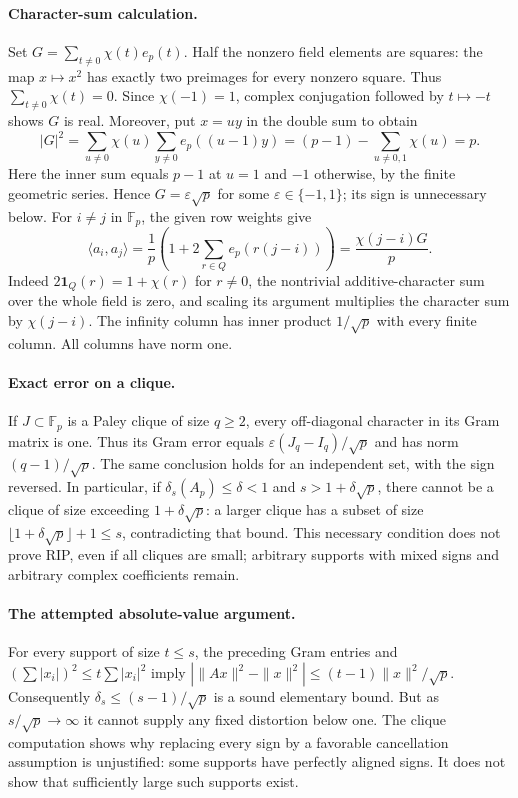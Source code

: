 \documentclass[11pt]{article}
\begin{document}
\paragraph{Character-sum calculation.}
Set $G=\sum_{t\ne0}\chi(t)e_p(t)$. Half the nonzero field elements are
squares: the map $x\mapsto x^2$ has exactly two preimages for every nonzero
square. Thus $\sum_{t\ne0}\chi(t)=0$. Since $\chi(-1)=1$,
complex conjugation followed by $t\mapsto-t$ shows $G$ is real.
Moreover, put $x=uy$ in the double sum to obtain
\[
|G|^2=\sum_{u\ne0}\chi(u)\sum_{y\ne0}e_p((u-1)y)
=(p-1)-\sum_{u\ne0,1}\chi(u)=p.
\]
Here the inner sum equals $p-1$ at $u=1$ and $-1$ otherwise, by the finite
geometric series. Hence $G=\varepsilon\sqrt p$ for some
$\varepsilon\in\{-1,1\}$; its sign is unnecessary below.
For $i\ne j$ in $\mathbb F_p$, the given row weights give
\[
\langle a_i,a_j\rangle
=\frac1p\left(1+2\sum_{r\in Q}e_p(r(j-i))\right)
=\frac{\chi(j-i)G}{p}.
\]
Indeed $2\boldsymbol1_Q(r)=1+\chi(r)$ for $r\ne0$, the nontrivial
additive-character sum over the whole field is zero, and scaling its argument
multiplies the character sum by $\chi(j-i)$. The infinity column has inner
product $1/\sqrt p$ with every finite column. All columns have norm one.

\paragraph{Exact error on a clique.}
If $J\subset\mathbb F_p$ is a Paley clique of size $q\ge2$, every off-diagonal
character in its Gram matrix is one. Thus its Gram error equals
$\varepsilon(J_q-I_q)/\sqrt p$ and has norm $(q-1)/\sqrt p$.
The same conclusion holds for an independent set, with the sign reversed.
In particular, if $\delta_s(A_p)\le\delta<1$ and
$s>1+\delta\sqrt p$, there cannot be a clique of size exceeding
$1+\delta\sqrt p$: a larger clique has a subset of size
$\lfloor1+\delta\sqrt p\rfloor+1\le s$, contradicting that bound.
This necessary condition does not prove RIP, even if all cliques are small;
arbitrary supports with mixed signs and arbitrary complex coefficients remain.

\paragraph{The attempted absolute-value argument.}
For every support of size $t\le s$, the preceding Gram entries and
$(\sum|x_i|)^2\le t\sum|x_i|^2$ imply
$|\|Ax\|^2-\|x\|^2|\le(t-1)\|x\|^2/\sqrt p$.
Consequently $\delta_s\le(s-1)/\sqrt p$ is a sound elementary bound.
But as $s/\sqrt p\to\infty$ it cannot supply any fixed distortion below one.
The clique computation shows why replacing every sign by a favorable
cancellation assumption is unjustified: some supports have perfectly aligned
signs. It does not show that sufficiently large such supports exist.
\end{document}
